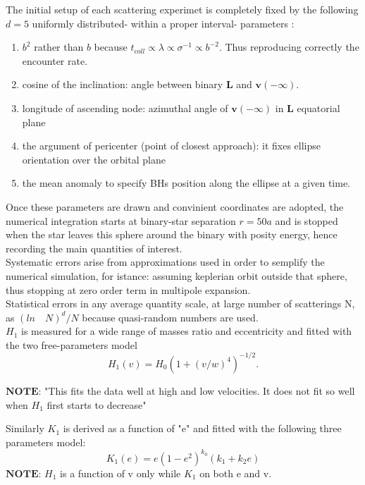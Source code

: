 The initial setup of each scattering experimet is completely fixed by the following $d=5$ uniformly distributed- within a proper interval- parameters :
\begin{enumerate}
    \item $b^2$ rather than $b$ because $t_{coll}\propto \lambda\propto \sigma^{-1}\propto b^{-2}$. Thus reproducing correctly the encounter rate.
    \item  cosine of the inclination: angle between binary $\mathbf{L}$ and $\mathbf{v}(-\infty)$.
    \item  longitude of ascending node: azimuthal angle of $\mathbf{v}(-\infty)$ in $\mathbf{L}$ equatorial plane
    \item  the argument of pericenter (point of closest approach): it fixes ellipse orientation over the orbital plane
    \item  the mean anomaly to specify BHs position along the ellipse at a given time.

\end{enumerate}

Once these parameters are drawn and convinient coordinates are adopted, the numerical integration starts at binary-star separation $r=50a$ and is stopped when the star leaves this sphere around the binary with posity energy, hence recording the main quantities of interest.\\Systematic errors arise from approximations used in order to semplify the numerical simulation, for istance: assuming keplerian orbit outside that sphere, thus stopping at zero order term in multipole expansion.\\Statistical errors in any average quantity scale, at large number of scatterings N, as $(ln\quad N)^d/N$ because quasi-random numbers are used.\\$H_1$ is measured for a wide range of masses ratio and eccentricity and fitted with the two free-parameters model
\begin{equation}
    H_1(v)=H_0(1+(v/w)^4)^{-1/2}.
\end{equation}




$\mathbf{NOTE}$: "This fits the data well at high and low velocities. It does not fit so well when $H_1$ first starts to decrease"

Similarly $K_1$ is derived as a function of "e" and fitted with the following three parameters model:
\begin{equation}
    K_1(e)=e(1-e^2)^{k_0}(k_1+k_2e)
\end{equation}
$\mathbf{NOTE}$: $H_1$ is a function of v only while $K_1$ on both e and v.



